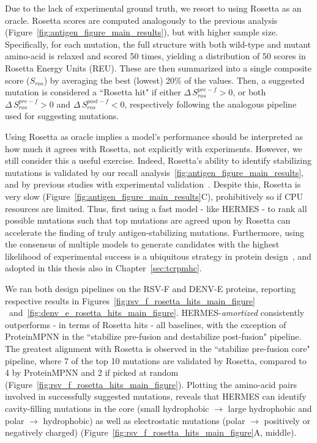 {Due to the lack of experimental ground truth, we resort to using Rosetta as an oracle.
Rosetta scores are computed analogously to the previous analysis (Figure~\ref{fig:antigen_figure_main_results}),
but with higher sample size.
Specifically, for each mutation, the full structure with both wild-type and mutant amino-acid is
relaxed and scored 50 times, yielding a distribution of 50 scores in Rosetta Energy Units (REU).
These are then summarized into a single composite score ($S_{ros}$) by averaging the best (lowest) 20\% of the values.
Then, a suggested mutation is considered a ``Rosetta hit" if either
$\Delta\,S_{ros}^{pre-f} > 0$, or both $\Delta\,S_{ros}^{pre-f} > 0$ and $\Delta\,S_{ros}^{post-f} < 0$,
respectively following the analogous pipeline used for suggesting mutations.

Using Rosetta as oracle implies a model's performance should be interpreted as how much it agrees with Rosetta, not explicitly with experiments.
However, we still consider this a useful exercise.
Indeed, Rosetta's ability to identify stabilizing mutations is validated by our recall analysis~\ref{fig:antigen_figure_main_results},
and by previous studies with experimental validation~\citep{gonzalez_general_2024, phan_conserved_2022}.
Despite this, Rosetta is very slow (Figure~\ref{fig:antigen_figure_main_results}C), prohibitively so if CPU resources are limited.
Thus, first using a fast model - like HERMES - to rank all possible mutations such that top mutations are agreed upon by
Rosetta can accelerate the finding of truly antigen-stabilizing mutations.
Furthermore, using the consensus of multiple models to generate candidates with the highest likelihood of experimental success
is a ubiquitous strategy in protein design~\citep{butcher_novo_2025, abramson_accurate_2024},
and adopted in this thesis also in Chapter~\ref{sec:tcrpmhc}.

We ran both design pipelines on the RSV-F and DENV-E proteins, reporting respective results in Figures~\ref{fig:rsv_f_rosetta_hits_main_figure}
~and~\ref{fig:denv_e_rosetta_hits_main_figure}.
HERMES-{\em amortized} consistently outperforms - in terms of Rosetta hits - all baselines, with the exception of ProteinMPNN
in the ``stabilize pre-fusion and destabilize post-fusion" pipeline.
The greatest alignment with Rosetta is observed in the ``stabilize pre-fusion core" pipeline, where 7 of the top 10 mutations
are validated by Rosetta, compared to 4 by ProteinMPNN and 2 if picked at random (Figure~\ref{fig:rsv_f_rosetta_hits_main_figure}).
Plotting the amino-acid pairs involved in successfully suggested mutations, reveals that HERMES can identify cavity-filling
mutations in the core (small hydrophobic $\to$ large hydrophobic and polar $\to$ hydrophobic) as well as electrostatic mutations
(polar $\to$ positively or negatively charged) (Figure~\ref{fig:rsv_f_rosetta_hits_main_figure}A, middle).

}
